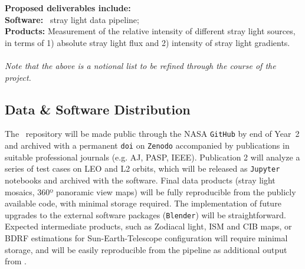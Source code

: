 \documentclass[usenames,dvipsnames,modern]{CLASS_FILES/aastex631}  %
\begin{document}
\textbf{Proposed deliverables include:}\\
\textbf{Software:} \MyName\ stray light data pipeline;\\  \textbf{Products:} Measurement of the relative intensity of different stray light sources, in terms of 1) absolute stray light flux and 2) intensity of stray light gradients.\\\\ 
\emph{Note that the above is a notional list to be refined through the course of the project.}


\subsection{Data \& Software Distribution}
\label{subsec:dataAvailability}
The \MyName\ repository will be made public through the NASA \texttt{GitHub} by end of Year~2 and archived with a permanent \texttt{doi} on \texttt{Zenodo} accompanied by publications in suitable professional journals (e.g. AJ, PASP, IEEE). Publication 2 will analyze a series of test cases on LEO and L2 orbits, which will be released as \texttt{Jupyter} notebooks and archived with the software. Final data products (stray light mosaics, 360º panoramic view maps) will be fully reproducible from the publicly available code, with minimal storage required. The implementation of future upgrades to the external software packages (\texttt{Blender}) will be straightforward. Expected intermediate products, such as Zodiacal light, ISM and CIB maps, or BDRF estimations for Sun-Earth-Telescope configuration will require minimal storage, and will be easily reproducible from the pipeline as additional output from \MyName.
\end{document}

